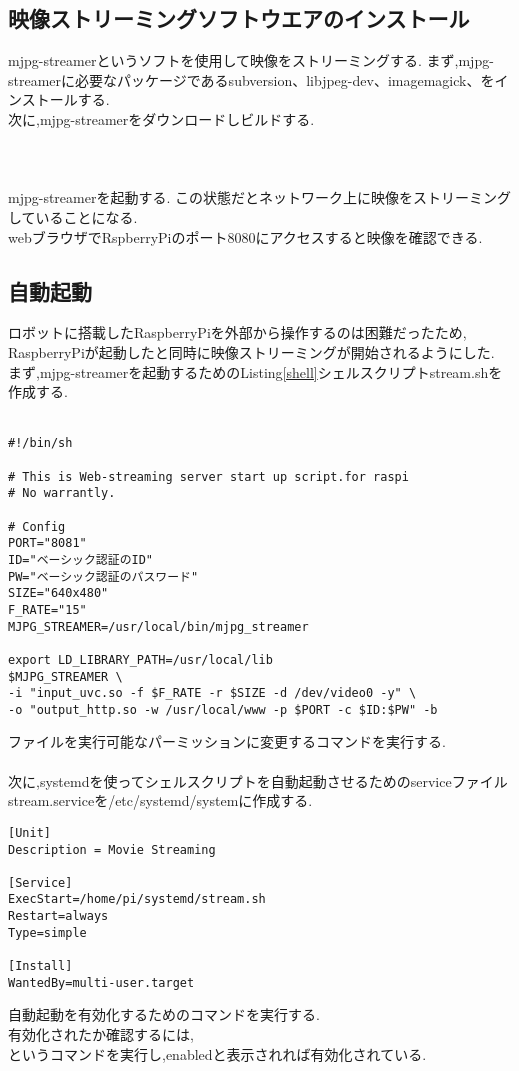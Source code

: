 \documentclass[12pt,oneside]{paper}
\begin{document}
\subsection{映像ストリーミングソフトウエアのインストール}
mjpg-streamerというソフトを使用して映像をストリーミングする.
まず,mjpg-streamerに必要なパッケージであるsubversion、libjpeg-dev、imagemagick、をインストールする.\\
次に,mjpg-streamerをダウンロードしビルドする.\\
\\
\\
\\
mjpg-streamerを起動する.
この状態だとネットワーク上に映像をストリーミングしていることになる.\\
webブラウザでRspberryPiのポート8080にアクセスすると映像を確認できる.

\subsection{自動起動}
ロボットに搭載したRaspberryPiを外部から操作するのは困難だったため,
RaspberryPiが起動したと同時に映像ストリーミングが開始されるようにした.
まず,mjpg-streamerを起動するためのListing\ref{shell}シェルスクリプトstream.shを作成する.\\
\\
\begin{lstlisting}[caption=シェルスクリプト,label=shell]
#!/bin/sh
 
# This is Web-streaming server start up script.for raspi
# No warrantly.
 
# Config
PORT="8081"
ID="ベーシック認証のID" 
PW="ベーシック認証のパスワード" 
SIZE="640x480" 
F_RATE="15" 
MJPG_STREAMER=/usr/local/bin/mjpg_streamer
 
export LD_LIBRARY_PATH=/usr/local/lib
$MJPG_STREAMER \
-i "input_uvc.so -f $F_RATE -r $SIZE -d /dev/video0 -y" \
-o "output_http.so -w /usr/local/www -p $PORT -c $ID:$PW" -b
\end{lstlisting}
ファイルを実行可能なパーミッションに変更するコマンドを実行する.\\
\\
次に,systemdを使ってシェルスクリプトを自動起動させるためのserviceファイルstream.serviceを/etc/systemd/systemに作成する.
\begin{lstlisting}[caption=serviceファイル,label=service]
[Unit]
Description = Movie Streaming

[Service]
ExecStart=/home/pi/systemd/stream.sh
Restart=always
Type=simple

[Install]
WantedBy=multi-user.target
\end{lstlisting}
自動起動を有効化するためのコマンドを実行する.\\
有効化されたか確認するには,\\
というコマンドを実行し,enabledと表示されれば有効化されている. 
\end{document}
